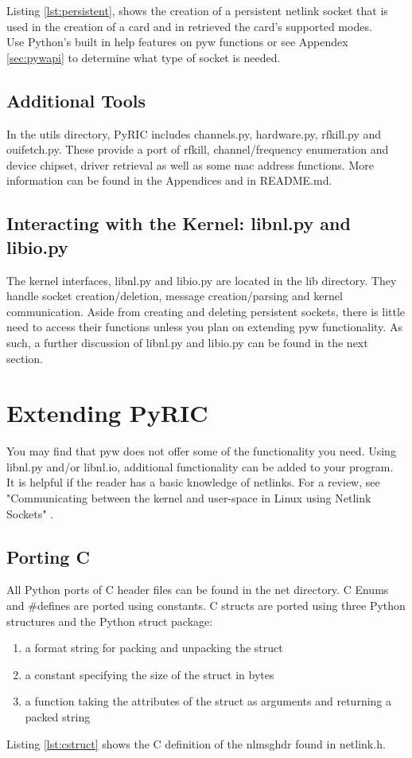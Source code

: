 \documentclass[11pt]{article}
\begin{document}
Listing \ref{lst:persistent}, shows the creation of a persistent netlink socket 
that is used in the creation of a card and in retrieved the card's supported
modes. \\

Use Python's built in help features on pyw functions or see Appendex \ref{sec:pywapi} 
to determine what type of socket is needed.

\subsection{Additional Tools}
In the utils directory, PyRIC includes channels.py, hardware.py, rfkill.py and
ouifetch.py. These provide a port of rfkill, channel/frequency enumeration and 
device chipset, driver retrieval as well as some mac address functions. More 
information can be found in the Appendices and in README.md. 

\subsection{Interacting with the Kernel: libnl.py and libio.py}
The kernel interfaces, libnl.py and libio.py are located in the lib directory.
They handle socket creation/deletion, message creation/parsing and kernel 
communication. Aside from creating and deleting persistent sockets, there is 
little need to access their functions unless you plan on extending pyw 
functionality. As such, a further discussion of libnl.py and libio.py can be 
found in the next section.   

\section{Extending PyRIC}\label{sec:extending}
You may find that pyw does not offer some of the functionality you need. Using
libnl.py and/or libnl.io, additional functionality can be added to your program.\\ 

It is helpful if the reader has a basic knowledge of netlinks. For a review, see 
"Communicating between the kernel and user-space in Linux using Netlink Sockets"
\cite{spae}. 

\subsection{Porting C}
All Python ports of C header files can be found in the net directory. C Enums 
and \#defines are ported using constants. C structs are ported using three 
Python structures and the Python struct package:
\begin{enumerate}
\item a format string for packing and unpacking the struct
\item a constant specifying the size of the struct in bytes
\item a function taking the attributes of the struct as arguments and returning
a packed string
\end{enumerate}
Listing \ref{lst:cstruct} shows the C definition of the nlmsghdr found in netlink.h.
\end{document}
